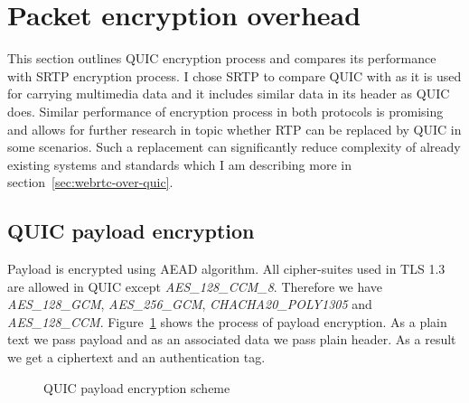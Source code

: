 \clearpage

\section{Packet encryption overhead}
\label{sec:packet-encryption-overhead}
This section outlines QUIC encryption process and compares its performance with SRTP encryption process.
I chose SRTP to compare QUIC with as it is used for carrying multimedia data and it includes similar data in its
header as QUIC does.
Similar performance of encryption process in both protocols is promising and allows for further research in topic
whether RTP can be replaced by QUIC in some scenarios.
Such a replacement can significantly reduce complexity of already existing systems and standards which I am describing
more in section~\ref{sec:webrtc-over-quic}.

\subsection{QUIC payload encryption}
\label{subsec:quic-payload-encryption}
Payload is encrypted using AEAD algorithm.
All cipher-suites used in TLS 1.3 are allowed in QUIC except \textit{AES\_128\_CCM\_8}.
Therefore we have \textit{AES\_128\_GCM}, \textit{AES\_256\_GCM}, \textit{CHACHA20\_POLY1305} and \textit{AES\_128\_CCM}.
Figure~\ref{fig:payload_enc} shows the process of payload encryption.
As a plain text we pass payload and as an associated data we pass plain header.
As a result we get a ciphertext and an authentication tag.

\begin{figure}[h]
    \centering
    \caption{QUIC payload encryption scheme}
    \label{fig:payload_enc}
\end{figure}

